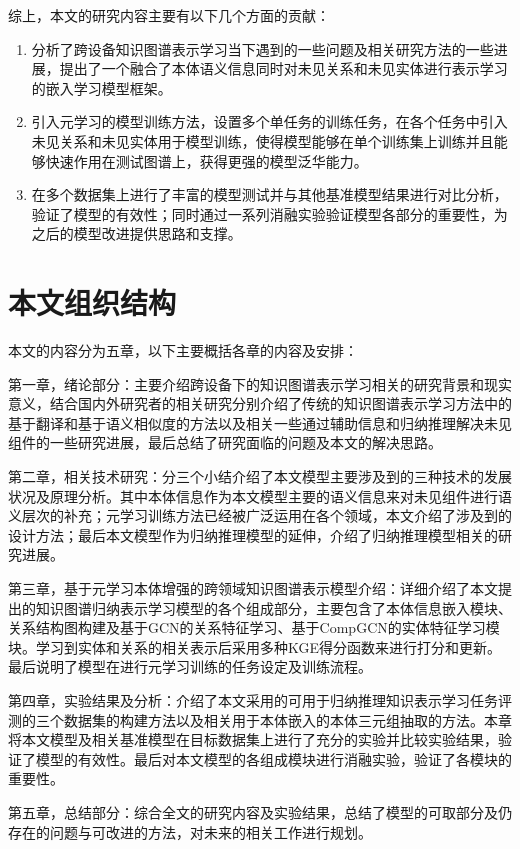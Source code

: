 综上，本文的研究内容主要有以下几个方面的贡献：
\begin{enumerate}[label=\arabic*)]
  \item 分析了跨设备知识图谱表示学习当下遇到的一些问题及相关研究方法的一些进展，提出了一个融合了本体语义信息同时对未见关系和未见实体进行表示学习的嵌入学习模型框架。

  \item 引入元学习的模型训练方法，设置多个单任务的训练任务，在各个任务中引入未见关系和未见实体用于模型训练，使得模型能够在单个训练集上训练并且能够快速作用在测试图谱上，获得更强的模型泛华能力。

  \item 在多个数据集上进行了丰富的模型测试并与其他基准模型结果进行对比分析，验证了模型的有效性；同时通过一系列消融实验验证模型各部分的重要性，为之后的模型改进提供思路和支撑。
\end{enumerate}

\section{本文组织结构}
本文的内容分为五章，以下主要概括各章的内容及安排：

第一章，绪论部分：主要介绍跨设备下的知识图谱表示学习相关的研究背景和现实意义，结合国内外研究者的相关研究分别介绍了传统的知识图谱表示学习方法中的基于翻译和基于语义相似度的方法以及相关一些通过辅助信息和归纳推理解决未见组件的一些研究进展，最后总结了研究面临的问题及本文的解决思路。

第二章，相关技术研究：分三个小结介绍了本文模型主要涉及到的三种技术的发展状况及原理分析。其中本体信息作为本文模型主要的语义信息来对未见组件进行语义层次的补充；元学习训练方法已经被广泛运用在各个领域，本文介绍了涉及到的设计方法；最后本文模型作为归纳推理模型的延伸，介绍了归纳推理模型相关的研究进展。

第三章，基于元学习本体增强的跨领域知识图谱表示模型介绍：详细介绍了本文提出的知识图谱归纳表示学习模型的各个组成部分，主要包含了本体信息嵌入模块、关系结构图构建及基于GCN的关系特征学习、基于CompGCN的实体特征学习模块。学习到实体和关系的相关表示后采用多种KGE得分函数来进行打分和更新。最后说明了模型在进行元学习训练的任务设定及训练流程。

第四章，实验结果及分析：介绍了本文采用的可用于归纳推理知识表示学习任务评测的三个数据集的构建方法以及相关用于本体嵌入的本体三元组抽取的方法。本章将本文模型及相关基准模型在目标数据集上进行了充分的实验并比较实验结果，验证了模型的有效性。最后对本文模型的各组成模块进行消融实验，验证了各模块的重要性。

第五章，总结部分：综合全文的研究内容及实验结果，总结了模型的可取部分及仍存在的问题与可改进的方法，对未来的相关工作进行规划。